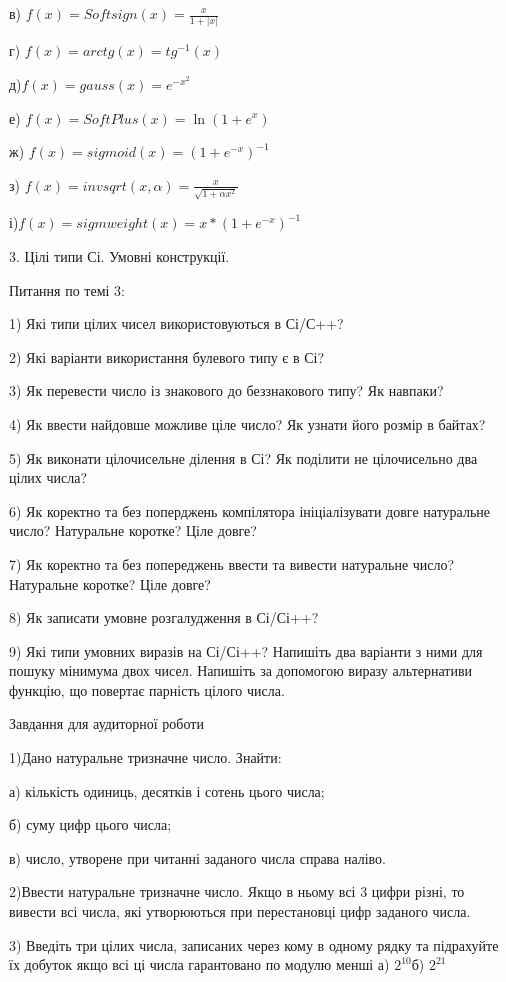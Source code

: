 \documentclass[]{article}
\begin{document}
в) \(f(x) = Softsign(x) = \frac{x}{1 + |x|}\)

г) \(f(x) = arctg(x) = tg^{- 1}(x)\)

д)\(f(x) = gauss(x) = e^{- x^{2}}\)

е) \(f(x) = SoftPlus(x) = \ln(1 + e^{x})\)

ж) \(f(x) = sigmoid(x) = {(1 + e^{- x})}^{- 1}\)

з) \(f(x) = invsqrt(x,\alpha) = \frac{x}{\sqrt{1 + \alpha x^{2}}}\)

і)\(f(x) = sigmweight(x) = x*{(1 + e^{- x})}^{- 1}\)

3. Цілі типи Сі. Умовні конструкції.

Питання по темі 3:

1) Які типи цілих чисел використовуються в Сі/С++?

2) Які варіанти використання булевого типу є в Сі?

3) Як перевести число із знакового до беззнакового типу? Як навпаки?

4) Як ввести найдовше можливе ціле число? Як узнати його розмір в
байтах?

5) Як виконати цілочисельне ділення в Сі? Як поділити не цілочисельно
два цілих числа?

6) Як коректно та без поперджень компілятора ініціалізувати довге
натуральне число? Натуральне коротке? Ціле довге?

7) Як коректно та без попереджень ввести та вивести натуральне число?
Натуральне коротке? Ціле довге?

8) Як записати умовне розгалудження в Сі/Сі++?

9) Які типи умовних виразів на Сі/Сі++? Напишіть два варіанти з ними для
пошуку мінимума двох чисел. Напишіть за допомогою виразу альтернативи
функцію, що повертає парність цілого числа.

Завдання для аудиторної роботи

1)Дано натуральне тризначне число. Знайти:

а) кількість одиниць, десятків і сотень цього числа;

б) суму цифр цього числа;

в) число, утворене при читанні заданого числа справа наліво.

2)Ввести натуральне тризначне число. Якщо в ньому всі 3 цифри різні, то
вивести всі числа, які утворюються при перестановці цифр заданого числа.

3) Введіть три цілих числа, записаних через кому в одному рядку та
підрахуйте їх добуток якщо всі ці числа гарантовано по модулю менші а)
\(2^{10}\)б) \(2^{21}\)
\end{document}
